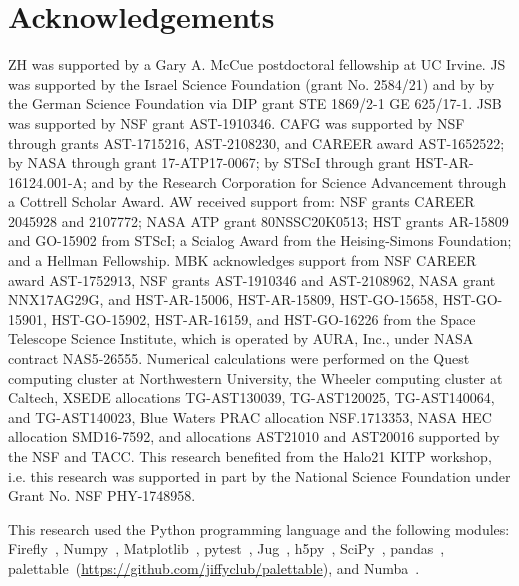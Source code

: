 \documentclass[fleqn,usenatbib]{mnras}
\begin{document}
\section*{Acknowledgements}

ZH was supported by a Gary A. McCue postdoctoral fellowship at UC Irvine.
JS was supported by the Israel Science Foundation (grant No. 2584/21) and by by the German Science Foundation via DIP grant STE 1869/2-1 GE 625/17-1. 
JSB was supported by NSF grant AST-1910346.
CAFG was supported by NSF through grants AST-1715216, AST-2108230,  and CAREER award AST-1652522; by NASA through grant 17-ATP17-0067; by STScI through grant HST-AR-16124.001-A; and by the Research Corporation for Science Advancement through a Cottrell Scholar Award.
AW received support from: NSF grants CAREER 2045928 and 2107772; NASA ATP grant 80NSSC20K0513; HST grants AR-15809 and GO-15902 from STScI; a Scialog Award from the Heising-Simons Foundation; and a Hellman Fellowship.
MBK acknowledges support from NSF CAREER award AST-1752913, NSF grants AST-1910346 and AST-2108962, NASA grant NNX17AG29G, and HST-AR-15006, HST-AR-15809, HST-GO-15658, HST-GO-15901, HST-GO-15902, HST-AR-16159, and HST-GO-16226 from the Space Telescope Science Institute, which is operated by AURA, Inc., under NASA contract NAS5-26555.
Numerical calculations were performed on the Quest computing cluster at Northwestern University, the Wheeler computing cluster at Caltech, XSEDE allocations TG-AST130039, TG-AST120025, TG-AST140064, and TG-AST140023, Blue Waters PRAC allocation NSF.1713353, NASA HEC allocation SMD16-7592, and allocations AST21010 and AST20016 supported by the NSF and TACC.
This research benefited from the Halo21 KITP workshop, i.e. this research was supported in part by the National Science Foundation under Grant No. NSF PHY-1748958.

This research used the Python programming language and the following modules:
Firefly~\citep{Geller2018},
Numpy~\citep{Harris2020},
Matplotlib~\citep{Hunter2007},
pytest~\citep{pytest3.4},
Jug~\citep{Coelho2017},
h5py~\citep{h5py},
SciPy~\citep{Virtanen2020},
pandas~\citep{McKinney2010,Reback2020},
palettable~(\url{https://github.com/jiffyclub/palettable}),
and Numba~\citep{Lam2015}.





\end{document}
